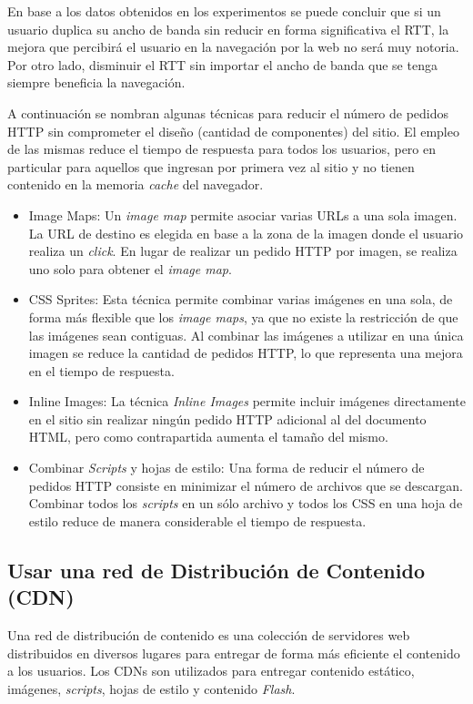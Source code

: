 En base a los datos obtenidos en los experimentos se puede concluir que si un usuario duplica su ancho de banda sin reducir en forma significativa el RTT, la mejora
que percibirá el usuario en la navegación por la web no será muy notoria. Por otro lado, disminuir el RTT sin importar el ancho de banda que se tenga siempre beneficia
la navegación.

A continuación se nombran algunas técnicas para reducir el número de pedidos HTTP sin comprometer el diseño (cantidad de componentes) del sitio.
El empleo de las mismas reduce el tiempo de respuesta para todos los usuarios, pero en particular para aquellos que ingresan por primera vez al sitio y no tienen contenido en la
memoria \emph{cache} del navegador.

\begin{itemize}
\item
Image Maps: Un \emph{image map} permite asociar varias URLs a una sola imagen. La URL de destino es elegida en base a la zona de la imagen donde el usuario realiza un \emph{click}. En lugar de realizar un pedido HTTP por imagen, se realiza uno solo para obtener el \emph{image map}.
\item
CSS Sprites: Esta técnica permite combinar varias imágenes en una sola, de forma más flexible que los \emph{image maps}, ya que no existe la restricción de que las imágenes sean contiguas. Al combinar las imágenes a utilizar en una única imagen se reduce la cantidad de pedidos HTTP, lo que representa una mejora en el tiempo de respuesta.
\item
Inline Images: La técnica \emph{Inline Images} permite incluir imágenes directamente en el sitio sin realizar ningún pedido HTTP adicional al del documento HTML, pero como contrapartida aumenta el tamaño del mismo.
\item
Combinar \emph{Scripts} y hojas de estilo: Una forma de reducir el número de pedidos HTTP consiste en minimizar el número de archivos que se descargan. Combinar todos los \emph{scripts} en un sólo archivo y
todos los CSS en una hoja de estilo reduce de manera considerable el tiempo de respuesta.
\end{itemize}

\subsection{Usar una red de Distribución de Contenido (CDN)}

Una red de distribución de contenido es una colección de servidores web distribuidos en diversos
lugares para entregar de forma más eficiente el contenido a los usuarios.
Los CDNs son utilizados para entregar contenido estático, imágenes, \emph{scripts}, hojas de estilo y contenido \emph{Flash}.


